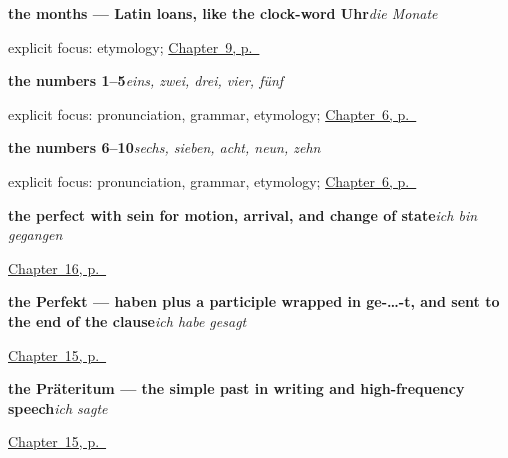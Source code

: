 \noindent\begin{minipage}[t]{\linewidth}
\raggedright
\textbf{the months — Latin loans, like the clock-word Uhr}\enspace\emph{die Monate}\par
\footnotesize explicit focus: etymology; \hyperref[ch:months-seasons]{Chapter~9, p.~\pageref*{ch:months-seasons}}
\end{minipage}\par\smallskip

\noindent\begin{minipage}[t]{\linewidth}
\raggedright
\textbf{the numbers 1–5}\enspace\emph{eins, zwei, drei, vier, fünf}\par
\footnotesize explicit focus: pronunciation, grammar, etymology; \hyperref[ch:numbers-1-10]{Chapter~6, p.~\pageref*{ch:numbers-1-10}}
\end{minipage}\par\smallskip

\noindent\begin{minipage}[t]{\linewidth}
\raggedright
\textbf{the numbers 6–10}\enspace\emph{sechs, sieben, acht, neun, zehn}\par
\footnotesize explicit focus: pronunciation, grammar, etymology; \hyperref[ch:numbers-1-10]{Chapter~6, p.~\pageref*{ch:numbers-1-10}}
\end{minipage}\par\smallskip

\noindent\begin{minipage}[t]{\linewidth}
\raggedright
\textbf{the perfect with sein for motion, arrival, and change of state}\enspace\emph{ich bin gegangen}\par
\footnotesize \hyperref[ch:sein]{Chapter~16, p.~\pageref*{ch:sein}}
\end{minipage}\par\smallskip

\noindent\begin{minipage}[t]{\linewidth}
\raggedright
\textbf{the Perfekt — haben plus a participle wrapped in ge-…-t, and sent to the end of the clause}\enspace\emph{ich habe gesagt}\par
\footnotesize \hyperref[ch:perfekt]{Chapter~15, p.~\pageref*{ch:perfekt}}
\end{minipage}\par\smallskip

\noindent\begin{minipage}[t]{\linewidth}
\raggedright
\textbf{the Präteritum — the simple past in writing and high-frequency speech}\enspace\emph{ich sagte}\par
\footnotesize \hyperref[ch:perfekt]{Chapter~15, p.~\pageref*{ch:perfekt}}
\end{minipage}\par\smallskip


